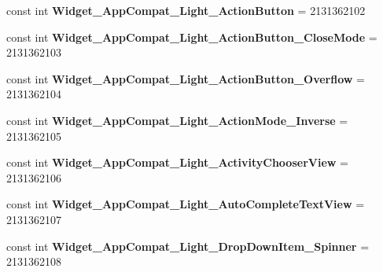 \begin{DoxyCompactItemize}
\item 
\mbox{\label{class_pinned_app_1_1_droid_1_1_resource_1_1_style_a430ca5edcbf6991ac8b423aa3085ff9e}} 
const int {\bfseries Widget\+\_\+\+App\+Compat\+\_\+\+Light\+\_\+\+Action\+Button} = 2131362102
\item 
\mbox{\label{class_pinned_app_1_1_droid_1_1_resource_1_1_style_a855b69cba5ee97600dcfda6286574ca0}} 
const int {\bfseries Widget\+\_\+\+App\+Compat\+\_\+\+Light\+\_\+\+Action\+Button\+\_\+\+Close\+Mode} = 2131362103
\item 
\mbox{\label{class_pinned_app_1_1_droid_1_1_resource_1_1_style_aeca3d3d386bf16d4615bbc2cd0f638c3}} 
const int {\bfseries Widget\+\_\+\+App\+Compat\+\_\+\+Light\+\_\+\+Action\+Button\+\_\+\+Overflow} = 2131362104
\item 
\mbox{\label{class_pinned_app_1_1_droid_1_1_resource_1_1_style_a65397829411cdf5ee6b1ebef4c7682ca}} 
const int {\bfseries Widget\+\_\+\+App\+Compat\+\_\+\+Light\+\_\+\+Action\+Mode\+\_\+\+Inverse} = 2131362105
\item 
\mbox{\label{class_pinned_app_1_1_droid_1_1_resource_1_1_style_a234debef1d84832e22328696421d653c}} 
const int {\bfseries Widget\+\_\+\+App\+Compat\+\_\+\+Light\+\_\+\+Activity\+Chooser\+View} = 2131362106
\item 
\mbox{\label{class_pinned_app_1_1_droid_1_1_resource_1_1_style_a0c94503ccc6e2f569fcd2c08988bd80c}} 
const int {\bfseries Widget\+\_\+\+App\+Compat\+\_\+\+Light\+\_\+\+Auto\+Complete\+Text\+View} = 2131362107
\item 
\mbox{\label{class_pinned_app_1_1_droid_1_1_resource_1_1_style_a25da8af6177791c65a97f731ec21c32c}} 
const int {\bfseries Widget\+\_\+\+App\+Compat\+\_\+\+Light\+\_\+\+Drop\+Down\+Item\+\_\+\+Spinner} = 2131362108
\item 
\mbox{\label{class_pinned_app_1_1_droid_1_1_resource_1_1_style_a60fff32df588cd547a82e10ef2d7a0b9}} 

\end{DoxyCompactItemize}
